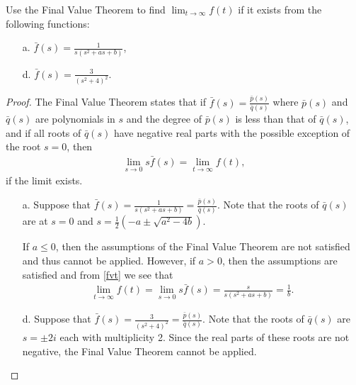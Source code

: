 \begin{problem}{3.28}
  Use the Final Value Theorem to find $\displaystyle \lim_{t\to\infty} f(t)$ if it exists from the following functions:
  \begin{enumerate}
    \item[a.] $\displaystyle \bar{f}(s) = \frac{1}{s(s^2+as + b)}$,
    \item[d.] $\displaystyle \bar{f}(s) = \frac{3}{(s^2 + 4)^2}$.
  \end{enumerate}
\end{problem}

\begin{proof}
  The Final Value Theorem states that if $\displaystyle \bar{f}(s) = \frac{\bar{p}(s)}{\bar{q}(s)}$ where
  $\bar{p}(s)$ and $\bar{q}(s)$ are polynomials in $s$ and the degree of $\bar{p}(s)$
  is less than that of $\bar{q}(s)$, and if all roots of $\bar{q}(s)$ have negative real parts
  with the possible exception of the root $s=0$, then
  \begin{align}\label{fvt}
    \lim_{s\to 0} s\bar{f}(s) = \lim_{t\to\infty} f(t),
  \end{align}
  if the limit exists.

  \begin{enumerate}
    \item[a.] Suppose that $\displaystyle \bar{f}(s) = \frac{1}{s(s^2+as + b)} = \frac{\bar{p}(s)}{\bar{q}(s)}$.
      Note that the roots of $\bar{q}(s)$ are at $s = 0$ and $\displaystyle s=\frac{1}{2}(-a \pm \sqrt{a^2-4b})$.

      If $a\leq 0$, then the assumptions of the Final Value Theorem are not satisfied and thus cannot be applied.
      However, if $a > 0$, then the assumptions are satisfied and from \eqref{fvt} we see that
      \begin{align*}
        \lim_{t\to\infty}f(t) = \lim_{s\to 0} s\bar{f}(s) = \frac{s}{s(s^2+as + b)} = \frac{1}{b}.
      \end{align*}

    \item[d.] Suppose that $\displaystyle \bar{f}(s) = \frac{3}{(s^2 + 4)^2} = \frac{\bar{p}(s)}{\bar{q}(s)}$. Note that
      the roots of $\bar{q}(s)$ are $s = \pm 2i$ each with multiplicity 2. Since
      the real parts of these roots are not negative, the Final Value Theorem cannot be applied.
  \end{enumerate}
\end{proof}
\newpage
